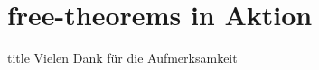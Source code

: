 \documentclass{beamer}
\begin{document}

\section{free-theorems in Aktion}
  
  
\begin{frame}
\vfill
\centering
\begin{beamercolorbox}[sep=8pt,center,shadow=true,rounded=true]{title}
Vielen Dank für die Aufmerksamkeit\par%
\end{beamercolorbox}
\vfill
\end{frame}
\end{document}
